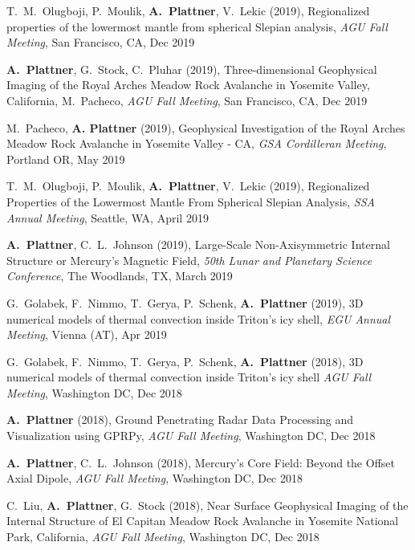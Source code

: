 \documentclass[10pt]{article}
\begin{document}
\spcp T.~M.~Olugboji, P.~Moulik, \textbf{A.~Plattner}, V.~Lekic (2019),
Regionalized properties of the lowermost mantle from spherical Slepian analysis,
\emph{AGU Fall Meeting}, San Francisco, CA, Dec 2019

\spcp \textbf{A.~Plattner}, G.~Stock, C.~Pluhar (2019),
Three-dimensional Geophysical Imaging of the Royal Arches Meadow Rock
Avalanche in Yosemite Valley, California, M.~Pacheco, \emph{AGU Fall
Meeting}, San Francisco, CA, Dec 2019

\spcp M.~Pacheco, \textbf{A. Plattner} (2019), Geophysical
Investigation of the Royal Arches Meadow Rock Avalanche in Yosemite
Valley - CA, \emph{GSA Cordilleran Meeting}, Portland OR, May 2019

\spcp T.~M.~Olugboji, P.~Moulik, \textbf{A.~Plattner}, V.~Lekic
(2019), Regionalized Properties of the Lowermost Mantle From Spherical
Slepian Analysis, \emph{SSA Annual Meeting}, Seattle, WA, April 2019

\spcp \textbf{A.~Plattner}, C.~L.~Johnson (2019),
Large-Scale Non-Axisymmetric Internal Structure or Mercury's Magnetic Field,
\emph{50th Lunar and Planetary Science Conference},
The Woodlands, TX, March 2019

\spcp G.~Golabek, F.~Nimmo, T.~Gerya, P.~Schenk, \textbf{A.~Plattner}
(2019), 3D numerical models of thermal convection inside Triton’s icy
shell, \emph{EGU Annual Meeting}, Vienna (AT), Apr 2019

\spcp G.~Golabek, F.~Nimmo, T.~Gerya, P.~Schenk, \textbf{A.~Plattner} (2018),
3D numerical models of thermal convection inside Triton's icy shell
\emph{AGU Fall Meeting}, Washington DC, Dec 2018

\spcp \textbf{A.~Plattner} (2018),
Ground Penetrating Radar Data Processing and Visualization using
GPRPy,
\emph{AGU Fall Meeting}, Washington DC, Dec 2018

\spcp \textbf{A.~Plattner}, C.~L.~Johnson (2018), 
Mercury's Core Field: Beyond the Offset Axial Dipole,
\emph{AGU Fall Meeting}, Washington DC, Dec 2018 


\spcp
C.~Liu, \textbf{A.~Plattner}, G.~Stock (2018),
Near Surface Geophysical Imaging of the Internal
Structure of El Capitan Meadow Rock Avalanche in Yosemite National
Park, California,
\emph{AGU Fall Meeting}, Washington DC, Dec 2018
\end{document}
